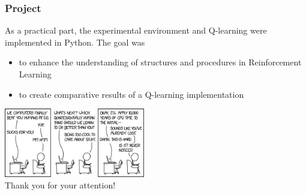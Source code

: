 \documentclass[ignorenonframetext]{beamer}
\begin{document}
\begin{frame}
	\frametitle{Project}
	As a practical part, the experimental environment and Q-learning were implemented in Python. The goal was 
	\begin{itemize}
		\item to enhance the understanding of structures and procedures in Reinforcement Learning
		\item to create comparative results of a Q-learning implementation 
	\end{itemize}
\begin{center}
\end{center}
\end{frame}


\begin{frame}
\begin{center}
\includegraphics[height=3cm]{Images/XKCD}\\ \vspace*{.5cm}
Thank you for your attention!

\end{center}
\end{frame}

\begin{frame}
	
	
\end{frame}
\end{document}
